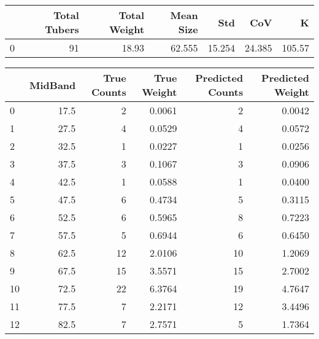 \begin{tabular}{lrrrrrr}
\toprule
{} &  Total Tubers &  Total Weight &  Mean Size &     Std &     CoV &       K \\
\midrule
0 &            91 &         18.93 &     62.555 &  15.254 &  24.385 &  105.57 \\
\bottomrule
\end{tabular}

\begin{tabular}{lrrrrr}
\toprule
{} &  MidBand &  True Counts &  True Weight &  Predicted Counts &  Predicted Weight \\
\midrule
0  &     17.5 &            2 &       0.0061 &                 2 &            0.0042 \\
1  &     27.5 &            4 &       0.0529 &                 4 &            0.0572 \\
2  &     32.5 &            1 &       0.0227 &                 1 &            0.0256 \\
3  &     37.5 &            3 &       0.1067 &                 3 &            0.0906 \\
4  &     42.5 &            1 &       0.0588 &                 1 &            0.0400 \\
5  &     47.5 &            6 &       0.4734 &                 5 &            0.3115 \\
6  &     52.5 &            6 &       0.5965 &                 8 &            0.7223 \\
7  &     57.5 &            5 &       0.6944 &                 6 &            0.6450 \\
8  &     62.5 &           12 &       2.0106 &                10 &            1.2069 \\
9  &     67.5 &           15 &       3.5571 &                15 &            2.7002 \\
10 &     72.5 &           22 &       6.3764 &                19 &            4.7647 \\
11 &     77.5 &            7 &       2.2171 &                12 &            3.4496 \\
12 &     82.5 &            7 &       2.7571 &                 5 &            1.7364 \\
\bottomrule
\end{tabular}

